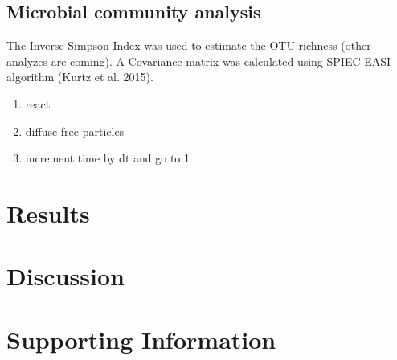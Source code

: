 \documentclass[10pt,letterpaper]{article}
\begin{document}
\subsection*{Microbial community analysis}
The Inverse Simpson Index was used to estimate the OTU richness (other analyzes are coming).
A Covariance matrix was calculated using SPIEC-EASI algorithm (Kurtz et al. 2015). 

\begin{enumerate}
\item{react}
\item{diffuse free particles}
\item{increment time by dt and go to 1}
\end{enumerate}

\section*{Results}

\section*{Discussion}

\section*{Supporting Information}

\begin{thebibliography}{10}


\end{thebibliography}
\end{document}
